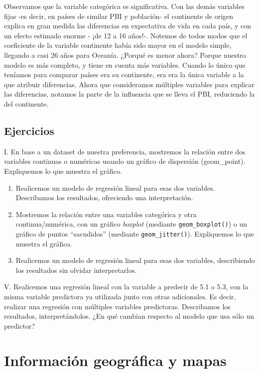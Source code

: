 \documentclass[spanish,]{book}
\begin{document}
Observamos que la variable categórica es significativa. Con las demás variables fijas -es decir, en países de similar PBI y población- el continente de origen explica en gran medida las diferencias en expectativa de vida en cada país, y con un efecto estimado enorme - ¡de 12 a 16 años!-. Notemos de todos modos que el coeficiente de la variable continente había sido mayor en el modelo simple, llegando a casi 26 años para Oceanía. ¿Porqué es menor ahora? Porque nuestro modelo es más completo, y tiene en cuenta más variables. Cuando lo único que teníamos para comparar países era su continente, era era la única variable a la que atribuir diferencias. Ahora que consideramos múltiples variables para explicar las diferencias, notamos la parte de la influencia que se lleva el PBI, reduciendo la del continente.

\hypertarget{ejercicios-3}{%
\section{Ejercicios}\label{ejercicios-3}}

I. En base a un dataset de nuestra preferencia, mostremos la relación entre dos variables continuas o numéricas usando un gráfico de dispersión (geom\_point). Expliquemos lo que muestra el gráfico.

\begin{enumerate}
\def\labelenumi{\Roman{enumi}.}
\setcounter{enumi}{1}
\item
  Realicemos un modelo de regresión lineal para esas dos variables. Describamos los resultados, ofreciendo una interpretación.
\item
  Mostremos la relación entre una variables categórica y otra continua/numérica, con un gráfico \emph{boxplot} (mediante \texttt{geom\_boxplot()}) o un gráfico de puntos ``sacudidos'' (mediante \texttt{geom\_jitter()}). Expliquemos lo que muestra el gráfico.
\item
  Realicemos un modelo de regresión lineal para esas dos variables, describiendo los resultados sin olvidar interpretarlos.
\end{enumerate}

V. Realicemos una regresión lineal con la variable a predecir de 5.1 o 5.3, con la misma variable predictora ya utilizada junto con otras adicionales. Es decir, realizar una regresión con múltiples variables predictoras. Describamos los resultados, interpretándolos. ¿En qué cambian respecto al modelo que usa sólo un predictor?

\hypertarget{informaciuxf3n-geogruxe1fica-y-mapas}{%
\chapter{Información geográfica y mapas}\label{informaciuxf3n-geogruxe1fica-y-mapas}}
\end{document}

